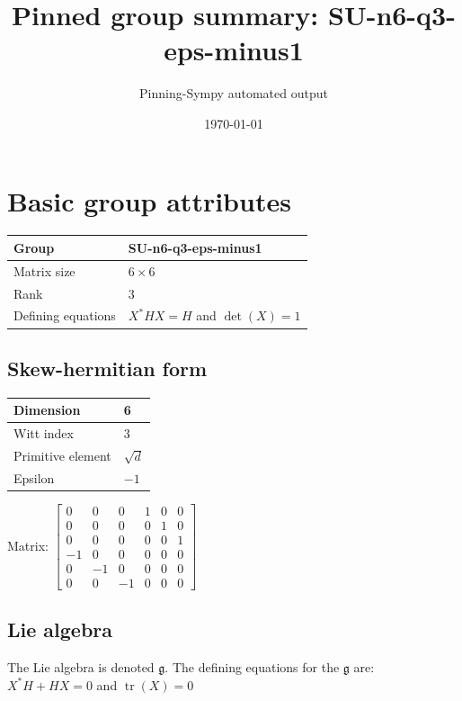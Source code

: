 \documentclass[11pt]{article}
\title{Pinned group summary: SU-n6-q3-eps-minus1}
\author{Pinning-Sympy automated output}
\date{\today}
\newcommand{\frakg}{\mathfrak{g}}
\theoremstyle{definition}
\begin{document}
\maketitle
\tableofcontents

\newpage

\section{Basic group attributes}

\def\arraystretch{1.2}
\begin{tabular}{|l|l|}
	\hline
    Group & SU-n6-q3-eps-minus1 \\
	\hline
    Matrix size & $6 \times 6$ \\
	\hline
    Rank & $3$ \\
	\hline
	Defining equations & $X^*HX=H$ and $\operatorname{det}(X)=1$ \\
	\hline
\end{tabular}
\def\arraystretch{1}

\subsection{Skew-hermitian form}
\begin{tabular}{|l|l|}
    \hline
    Dimension & 6 \\
    \hline
    Witt index & 3 \\
    \hline
    Primitive element & $\sqrt{d}$ \\
    \hline
    Epsilon & $-1$ \\
    \hline
\end{tabular}

\bigskip
\noindent Matrix: \(
\left[\begin{matrix}0 & 0 & 0 & 1 & 0 & 0\\0 & 0 & 0 & 0 & 1 & 0\\0 & 0 & 0 & 0 & 0 & 1\\-1 & 0 & 0 & 0 & 0 & 0\\0 & -1 & 0 & 0 & 0 & 0\\0 & 0 & -1 & 0 & 0 & 0\end{matrix}\right]
\)



\subsection{Lie algebra}

The Lie algebra is denoted $\frakg$. The defining equations for the $\frakg$ are: $X^*H + HX=0$ and $\operatorname{tr}(X)=0$
\end{document}
